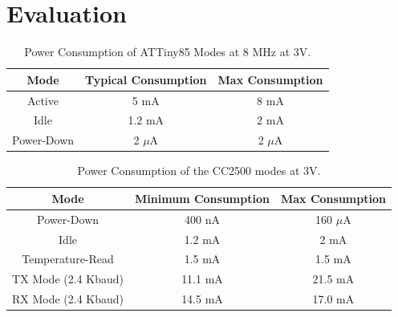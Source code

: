 \section{Evaluation}

%
%
\begin{table}%
  \begin{center}
  
  \begin{tabular}{| c | c | c |}

  \hline
  \textbf{Mode} & \textbf{Typical Consumption} & \textbf{Max Consumption} \\
  \hline
  Active      & 5 mA & 8 mA \\
  Idle        & 1.2 mA & 2 mA \\
  Power-Down  & 2 $\mu$A & 2 $\mu$A \\
  \hline
  
  \end{tabular}  
  \end{center}
  \caption{Power Consumption of ATTiny85 Modes at 8 MHz at 3V.
  \label{table:attiny85_power}  
  }
\end{table}

%
%
\begin{table}%
  \begin{center}
  
  \begin{tabular}{| c | c | c |}

  \hline
  \textbf{Mode} & \textbf{Minimum Consumption} & \textbf{Max Consumption} \\
  \hline
  Power-Down        & 400 nA & 160 $\mu$A \\
  Idle              & 1.2 mA & 2 mA \\
  Temperature-Read  & 1.5 mA & 1.5 mA \\
  TX Mode (2.4 Kbaud) & 11.1 mA & 21.5 mA \\
  RX Mode (2.4 Kbaud) & 14.5 mA & 17.0 mA \\
  \hline
  
  \end{tabular}  
  \end{center}
  \caption{Power Consumption of the CC2500 modes at 3V.
  \label{table:cc2500_power}  
  }
\end{table}

